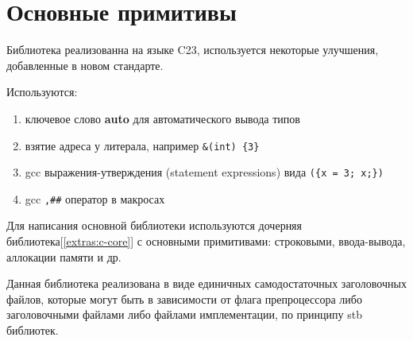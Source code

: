 
\clearpage
\section{Основные примитивы}
\label{primitives}

Библиотека реализованна на языке C23, используется некоторые улучшения, добавленные в новом стандарте.

Используются:
\begin{enumerate}
  \item ключевое слово \textbf{auto} для автоматического вывода типов
  \item взятие адреса у литерала, например \verb|&(int) {3}|
  \item gcc выражения-утверждения (statement expressions) вида \verb|({x = 3; x;})|
  \item gcc \verb|,##| оператор в макросах
\end{enumerate}

Для написания основной библиотеки используются дочерняя библиотека[\ref{extras:c-core}] с основными примитивами: 
строковыми, ввода-вывода, аллокации памяти и др.

Данная библиотека реализована в виде единичных самодостаточных заголовочных файлов, 
которые могут быть в зависимости от флага препроцессора либо заголовочными файлами либо файлами имплементации, 
по принципу stb библиотек\cite{stb_libs}.

